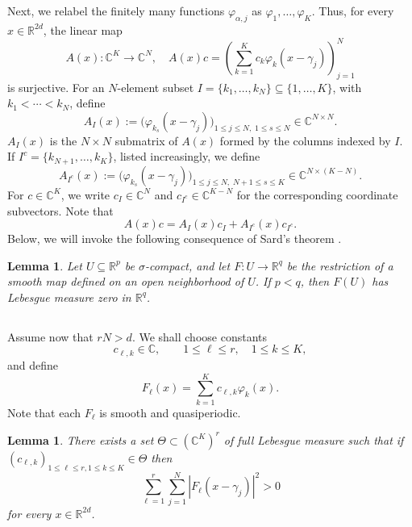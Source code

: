 \documentclass[reqno,a4paper,12pt]{amsart}
\numberwithin{equation}{section}
\newtheorem{lemma}[definition]{Lemma}
\def\C{{\mathbb C}}
\newcommand\1{\mathds{1}}
\begin{document}
Next, we relabel the finitely many functions $\varphi_{\alpha,j}$ as
$
\varphi_1,\dots,\varphi_K.
$
Thus, for every $x\in\mathbb R^{2d}$, the linear map
\begin{equation}\label{eq:Ax-definition}
    A(x):\mathbb C^K\to\mathbb C^N,
\quad
A(x)c
=
\left(
\sum_{k=1}^K c_k\varphi_k(x-\gamma_j)
\right)_{j=1}^N
\end{equation}
is surjective.
For an $N$-element subset $I=\{k_1,\dots,k_N\}\subseteq\{1,\dots,K\}$,
with $k_1<\cdots<k_N$, define
$$
A_I(x)
:=
\bigl(\varphi_{k_s}(x-\gamma_j)\bigr)_
{1\leq j\leq N,\;1\leq s\leq N}
\in \C^{N \times N}.
$$
$A_I(x)$ is the $N\times N$ submatrix of $A(x)$ formed by the
columns indexed by $I$.
If $I^c=\{k_{N+1},\dots,k_K\}$, listed increasingly, we define
$$
A_{I^c}(x)
:=
\bigl(\varphi_{k_s}(x-\gamma_j)\bigr)_
{1\leq j\leq N,\;N+1\leq s\leq K}
\in \mathbb C^{N \times (K-N)}.
$$
For $c\in\mathbb C^K$, we write $c_I\in\mathbb C^N$ and
$c_{I^c}\in\mathbb C^{K-N}$ for the corresponding coordinate subvectors.
Note that
\begin{equation}\label{eq:star_star}
    A(x)c=A_I(x)c_I+A_{I^c}(x)c_{I^c}.
\end{equation}
Below, we will invoke the following consequence of Sard's theorem \cite[Corollary 6.11]{Lee}.

\begin{lemma}\label{lma:sard}
Let $U\subseteq\mathbb R^p$ be $\sigma$-compact, and let
$F:U\to\mathbb R^q$ be the restriction of a smooth map defined on an open
neighborhood of $U$. If $p<q$, then $F(U)$ has Lebesgue measure zero in
$\mathbb R^q$.
\end{lemma}

\subsection{}
Assume now that
$
rN>d.
$
We shall choose constants
$$
c_{\ell,k}\in\mathbb C,
\qquad
1\leq \ell\leq r,\quad 1\leq k\leq K,
$$
and define
\begin{equation}\label{eq:Fl-linear-combination}
    F_\ell(x)
=
\sum_{k=1}^K c_{\ell,k}\varphi_k(x).
\end{equation}
Note that each $F_\ell$ is smooth and quasiperiodic.

\begin{lemma}
There exists a set $\Theta \subset (\mathbb C^K)^r$ of full Lebesgue measure such that if $(c_{\ell,k})_{1\leq \ell\leq r, 1\leq k\leq K} \in \Theta $ then
\begin{equation}\label{eq:no-common-zero-orbit}
    \sum_{\ell=1}^r\sum_{j=1}^N
|F_\ell(x-\gamma_j)|^2
>
0
\end{equation}
for every $x\in\mathbb R^{2d}$.
\end{lemma}
\end{document}
